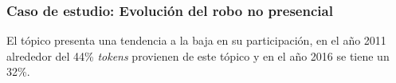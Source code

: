 \documentclass[
	spanish, %
	aspectratio=43, %
	hyperref={pdfencoding=auto,psdextra},
	xcolor={dvipsnames,table,usenames},
]{beamer}
\begin{document}
\begin{frame}
\frametitle{Caso de estudio: Evolución del robo no presencial}

El tópico presenta una tendencia a la baja en su participación, en el año 2011 alrededor del 44\% \textit{tokens }provienen de este tópico y en el año 2016 se tiene un 32\%.

\def\topic[#1,#2,#3]#4{
        \node[fill=#1, rounded corners, minimum height=40, minimum width=50, text width=1em] (#2) at #3 {}; 
        \node[anchor=north,inner sep=2pt,] at (#2.north)  {\fontsize{0.18cm}{0.2cm}\selectfont #4};
}
\def\tedge[#1,#2,#3,#4,#5];{ 
  \definecolor{color0}{RGB}{153,153,153}
  \draw[color=color0,#4,fill=white, line width=4*#5pt] (#1) -- #3
  (#2);  
}



\end{frame}
\end{document}
